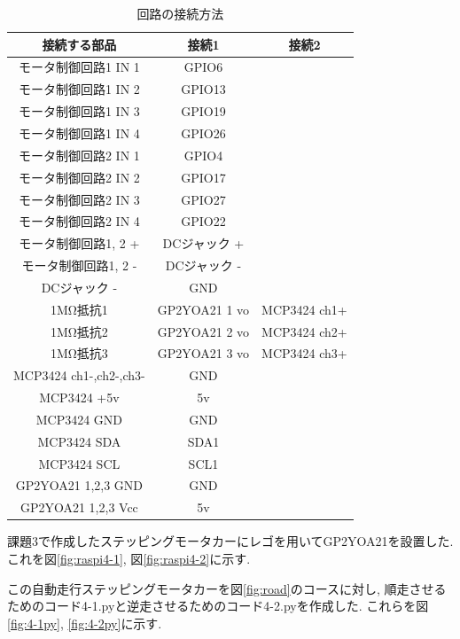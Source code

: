 \documentclass{ltjsarticle} %
\begin{document}
\begin{table}[H] %
  \centering %
  \caption{回路の接続方法}
  \begin{tabular}{|c|c|c|} 
  \hline %
  接続する部品 & 接続1 & 接続2 \\ \hline %
  モータ制御回路1 IN 1 & GPIO6 &   \\ \hline
  モータ制御回路1 IN 2 & GPIO13 &  \\ \hline
  モータ制御回路1 IN 3 & GPIO19 &  \\ \hline
  モータ制御回路1 IN 4 & GPIO26 &  \\ \hline
  モータ制御回路2 IN 1 & GPIO4 &   \\ \hline
  モータ制御回路2 IN 2 & GPIO17 &  \\ \hline
  モータ制御回路2 IN 3 & GPIO27 &  \\ \hline
  モータ制御回路2 IN 4 & GPIO22 &  \\ \hline
  モータ制御回路1, 2 + & DCジャック + & \\ \hline
  モータ制御回路1, 2 - & DCジャック - & \\ \hline
  DCジャック -  & GND & \\ \hline
  1MΩ抵抗1 & GP2YOA21 1 vo & MCP3424 ch1+ \\ \hline
  1MΩ抵抗2 & GP2YOA21 2 vo & MCP3424 ch2+ \\ \hline
  1MΩ抵抗3 & GP2YOA21 3 vo & MCP3424 ch3+ \\ \hline
  MCP3424 ch1-,ch2-,ch3- & GND &  \\ \hline
  MCP3424 +5v & 5v &  \\ \hline
  MCP3424 GND & GND &  \\ \hline
  MCP3424 SDA & SDA1 &  \\ \hline
  MCP3424 SCL & SCL1 &  \\ \hline
  GP2YOA21 1,2,3 GND & GND &  \\ \hline
  GP2YOA21 1,2,3 Vcc & 5v &  \\ \hline 
  
  \end{tabular}
  \label{tab:tab4} %
\end{table}

課題3で作成したステッピングモータカーにレゴを用いてGP2YOA21を設置した. 
これを図\ref{fig:raspi4-1}, 図\ref{fig:raspi4-2}に示す.  

この⾃動⾛⾏ステッピングモータカーを図\ref{fig:road}のコースに対し, 順走させるためのコード4-1.pyと逆走させるためのコード4-2.pyを作成した. 
これらを図\ref{fig:4-1py}, \ref{fig:4-2py}に示す. 
\end{document}
